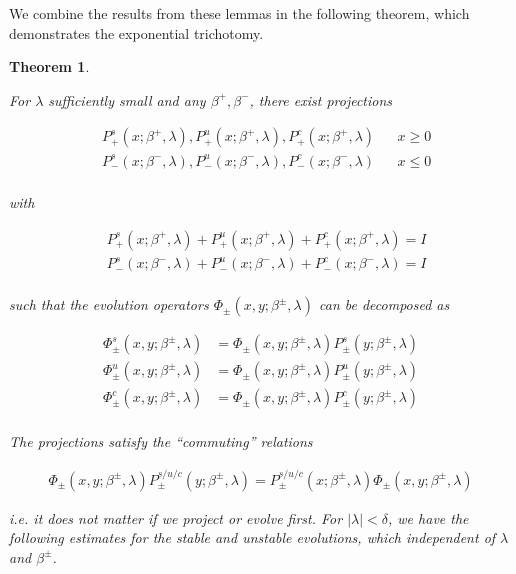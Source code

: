 \documentclass[12pt]{article}
\newtheorem{theorem}{Theorem}
\begin{document}
We combine the results from these lemmas in the following theorem, which demonstrates the exponential trichotomy. 


\begin{theorem}\label{trichotomy}

For $\lambda$ sufficiently small and any $\beta^+, \beta^-$, there exist projections

\begin{align*}
&P_+^s(x; \beta^+, \lambda), P_+^u(x; \beta^+, \lambda), P_+^c(x; \beta^+, \lambda) && x \geq 0 \\
&P_-^s(x; \beta^-, \lambda), P_-^u(x; \beta^-, \lambda), P_-^c(x; \beta^-, \lambda) && x \leq 0 \\
\end{align*}

with

\begin{align*}
&P_+^s(x; \beta^+, \lambda) + P_+^u(x; \beta^+, \lambda) + P_+^c(x; \beta^+, \lambda) = I \\
&P_-^s(x; \beta^-, \lambda) + P_-^u(x; \beta^-, \lambda) + P_-^c(x; \beta^-, \lambda) = I \\
\end{align*}

such that the evolution operators $\Phi_\pm(x, y; \beta^\pm, \lambda)$ can be decomposed as

\begin{align*}
\Phi^s_\pm(x, y; \beta^\pm, \lambda) &= \Phi_\pm(x, y; \beta^\pm, \lambda) P^s_\pm(y; \beta^\pm, \lambda) \\
\Phi^u_\pm(x, y; \beta^\pm, \lambda) &= \Phi_\pm(x, y; \beta^\pm, \lambda) P^u_\pm(y; \beta^\pm, \lambda) \\
\Phi^c_\pm(x, y; \beta^\pm, \lambda) &= \Phi_\pm(x, y; \beta^\pm, \lambda) P^c_\pm(y; \beta^\pm, \lambda) \\
\end{align*}

The projections satisfy the ``commuting'' relations

\begin{align*}
\Phi_\pm(x, y; \beta^\pm, \lambda) P^{s/u/c}_\pm(y; \beta^\pm, \lambda) 
= P^{s/u/c}_\pm(x; \beta^\pm, \lambda) \Phi_\pm(x, y; \beta^\pm, \lambda)
\end{align*}

i.e. it does not matter if we project or evolve first. For $|\lambda| < \delta$, we have the following estimates for the stable and unstable evolutions, which independent of $\lambda$ and $\beta^\pm$.


\end{theorem}
\end{document}
